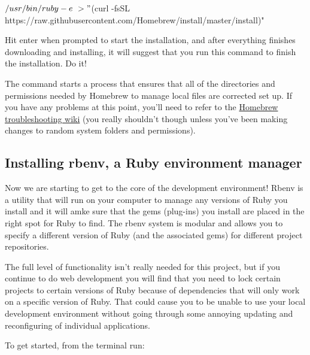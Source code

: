 \begin{codelisting}
\label{code:homebrew-install}
\begin{code}
$ /usr/bin/ruby -e \
> "$(curl -fsSL https://raw.githubusercontent.com/Homebrew/install/master/install)"
\end{code}
\end{codelisting}

Hit enter when prompted to start the installation, and after everything finishes downloading and installing, it will suggest that you run this command to finish the installation. Do it!

The  command starts a process that ensures that all of the directories and permissions needed by Homebrew to manage local files are corrected set up. If you have any problems at this point, you'll need to refer to the \href{https://github.com/Homebrew/homebrew/wiki/troubleshooting}{Homebrew troubleshooting wiki} (you really shouldn't though unless you've been making changes to random system folders and permissions).

\subsection{Installing rbenv, a Ruby environment manager}

\label{sec:rbenv}

Now we are starting to get to the core of the development environment! Rbenv is a utility that will run on your computer to manage any versions of Ruby you install and it will amke sure that the gems (plug-ins) you install are placed in the right spot for Ruby to find. The rbenv system is modular and allows you to specify a different version of Ruby (and the associated gems) for different project repositories.

The full level of functionality isn't really needed for this project, but if you continue to do web development you will find that you need to lock certain projects to certain versions of Ruby because of dependencies that will only work on a specific version of Ruby. That could cause you to be unable to use your local development environment without going through some annoying updating and reconfiguring of individual applications.

To get started, from the terminal run:

